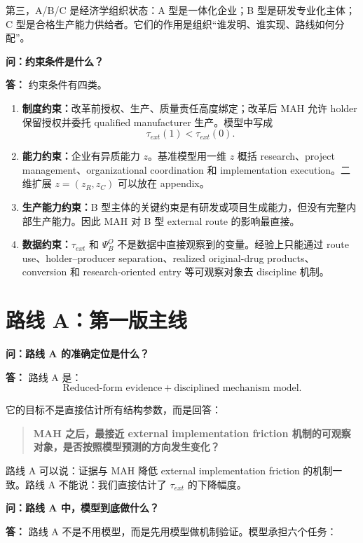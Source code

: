 \documentclass[10pt]{ctexart}
\newcommand{\qtitle}[1]{\vspace{0.35em}\noindent\textbf{问：#1}\par\vspace{0.15em}\noindent\textbf{答：}}
\newcommand{\key}[1]{\textbf{#1}}
\begin{document}
第三，A/B/C 是经济学组织状态：A 型是一体化企业；B 型是研发专业化主体；C 型是合格生产能力供给者。它们的作用是组织“谁发明、谁实现、路线如何分配”。

\qtitle{约束条件是什么？}
约束条件有四类。

\begin{enumerate}
    \item \key{制度约束：}改革前授权、生产、质量责任高度绑定；改革后 MAH 允许 holder 保留授权并委托 qualified manufacturer 生产。模型中写成
    \[
    \tau_{ext}(1)<\tau_{ext}(0).
    \]
    \item \key{能力约束：}企业有异质能力 \(z\)。基准模型用一维 \(z\) 概括 research、project management、organizational coordination 和 implementation execution。二维扩展 \(z=(z_R,z_C)\) 可以放在 appendix。
    \item \key{生产能力约束：}B 型主体的关键约束是有研发或项目生成能力，但没有完整内部生产能力。因此 MAH 对 B 型 external route 的影响最直接。
    \item \key{数据约束：}\(\tau_{ext}\) 和 \(\Psi_B^O\) 不是数据中直接观察到的变量。经验上只能通过 route use、holder--producer separation、realized original-drug products、conversion 和 research-oriented entry 等可观察对象去 discipline 机制。
\end{enumerate}

\section{路线 A：第一版主线}

\qtitle{路线 A 的准确定位是什么？}
路线 A 是：
\[
\text{Reduced-form evidence} + \text{disciplined mechanism model}.
\]

它的目标不是直接估计所有结构参数，而是回答：
\begin{quote}
\key{MAH 之后，最接近 external implementation friction 机制的可观察对象，是否按照模型预测的方向发生变化？}
\end{quote}

路线 A 可以说：证据与 MAH 降低 external implementation friction 的机制一致。路线 A 不能说：我们直接估计了 \(\tau_{ext}\) 的下降幅度。

\qtitle{路线 A 中，模型到底做什么？}
路线 A 不是不用模型，而是先用模型做机制验证。模型承担六个任务：
\end{document}
